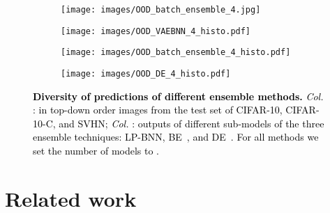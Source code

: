 \documentclass[10pt,twocolumn,letterpaper]{article}
\newcommand{\ab}[1]{\textcolor{black}{#1}}
\newcommand{\method}{LP-BNN\xspace}
\begin{document}
\begin{figure}[t!]
        \begin{subfigure}[b]{0.16\linewidth}
\texttt{[image: images/OOD\_batch\_ensemble\_4.jpg]}
\end{subfigure}\;
        \begin{subfigure}[b]{0.22\linewidth}
\texttt{[image: images/OOD\_VAEBNN\_4\_histo.pdf]}
\end{subfigure}\;
        \begin{subfigure}[b]{0.22\linewidth}
\texttt{[image: images/OOD\_batch\_ensemble\_4\_histo.pdf]}
\end{subfigure}\;
         \begin{subfigure}[b]{0.22\linewidth}
\texttt{[image: images/OOD\_DE\_4\_histo.pdf]}
\end{subfigure}\;
\vspace{2mm}      
\caption{\ab{\textbf{Diversity of predictions of different ensemble methods.} \emph{Col.} : in top-down order images from the test set of CIFAR-10,  CIFAR-10-C, and SVHN; \emph{Col.} : outputs of different sub-models of the three ensemble techniques:
\method, BE~\cite{wen2020batchensemble}, and DE~\cite{lakshminarayanan2017simple}. For all methods we set the number of models to . }}
\label{fig:diversityall}
\end{figure}




 \section{Related work}\label{section:related}
\end{document}
